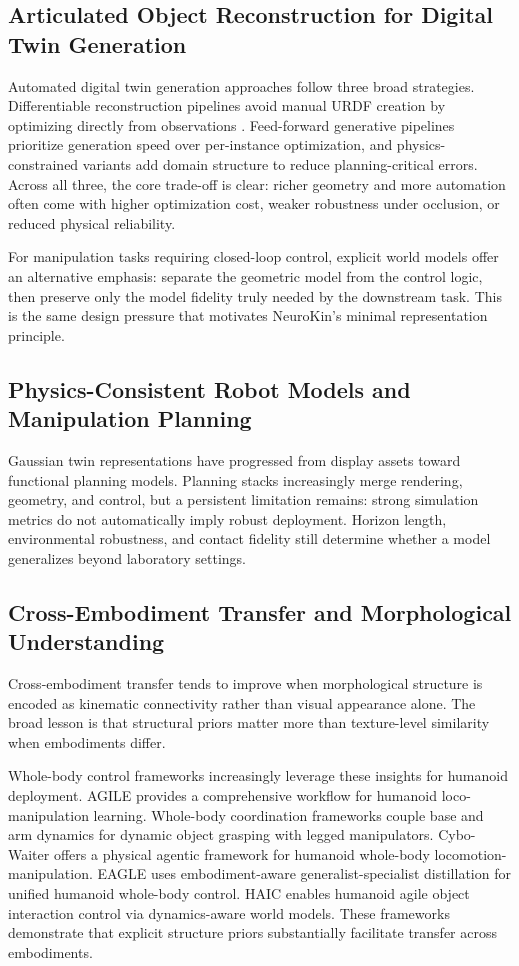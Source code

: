 ﻿\documentclass[12pt,a4paper,oneside]{report}
\begin{document}
\subsection{Articulated Object Reconstruction for Digital Twin Generation}

Automated digital twin generation approaches follow three broad strategies. Differentiable reconstruction pipelines avoid manual URDF creation by optimizing directly from observations \cite{heiden2022inferring}. Feed-forward generative pipelines prioritize generation speed over per-instance optimization, and physics-constrained variants add domain structure to reduce planning-critical errors. Across all three, the core trade-off is clear: richer geometry and more automation often come with higher optimization cost, weaker robustness under occlusion, or reduced physical reliability.

For manipulation tasks requiring closed-loop control, explicit world models offer an alternative emphasis: separate the geometric model from the control logic, then preserve only the model fidelity truly needed by the downstream task. This is the same design pressure that motivates NeuroKin's minimal representation principle.

\subsection{Physics-Consistent Robot Models and Manipulation Planning}

Gaussian twin representations have progressed from display assets toward functional planning models. Planning stacks increasingly merge rendering, geometry, and control, but a persistent limitation remains: strong simulation metrics do not automatically imply robust deployment. Horizon length, environmental robustness, and contact fidelity still determine whether a model generalizes beyond laboratory settings.

\subsection{Cross-Embodiment Transfer and Morphological Understanding}

Cross-embodiment transfer tends to improve when morphological structure is encoded as kinematic connectivity rather than visual appearance alone. The broad lesson is that structural priors matter more than texture-level similarity when embodiments differ.

Whole-body control frameworks increasingly leverage these insights for humanoid deployment. AGILE provides a comprehensive workflow for humanoid loco-manipulation learning. Whole-body coordination frameworks couple base and arm dynamics for dynamic object grasping with legged manipulators. Cybo-Waiter offers a physical agentic framework for humanoid whole-body locomotion-manipulation. EAGLE uses embodiment-aware generalist-specialist distillation for unified humanoid whole-body control. HAIC enables humanoid agile object interaction control via dynamics-aware world models. These frameworks demonstrate that explicit structure priors substantially facilitate transfer across embodiments.
\end{document}
